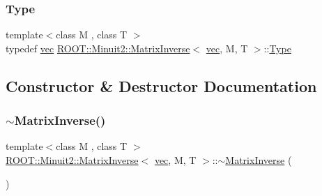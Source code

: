 \mbox{\label{classROOT_1_1Minuit2_1_1MatrixInverse_3_01vec_00_01M_00_01T_01_4_ae925e39424dcc097f76d033365b06efd}} 
\subsubsection{\texorpdfstring{Type}{Type}\hspace{0.1cm}{\footnotesize\ttfamily [3/3]}}
{\footnotesize\ttfamily template$<$class M , class T $>$ \\
typedef \mbox{\hyperlink{classROOT_1_1Minuit2_1_1vec}{vec}} \mbox{\hyperlink{classROOT_1_1Minuit2_1_1MatrixInverse}{R\+O\+O\+T\+::\+Minuit2\+::\+Matrix\+Inverse}}$<$ \mbox{\hyperlink{classROOT_1_1Minuit2_1_1vec}{vec}}, M, T $>$\+::\mbox{\hyperlink{classROOT_1_1Minuit2_1_1MatrixInverse_3_01vec_00_01M_00_01T_01_4_ae925e39424dcc097f76d033365b06efd}{Type}}}



\subsection{Constructor \& Destructor Documentation}
\mbox{\label{classROOT_1_1Minuit2_1_1MatrixInverse_3_01vec_00_01M_00_01T_01_4_ad267e62bc46dd1bab57b3194bd850be9}} 
\subsubsection{\texorpdfstring{$\sim$MatrixInverse()}{~MatrixInverse()}\hspace{0.1cm}{\footnotesize\ttfamily [1/3]}}
{\footnotesize\ttfamily template$<$class M , class T $>$ \\
\mbox{\hyperlink{classROOT_1_1Minuit2_1_1MatrixInverse}{R\+O\+O\+T\+::\+Minuit2\+::\+Matrix\+Inverse}}$<$ \mbox{\hyperlink{classROOT_1_1Minuit2_1_1vec}{vec}}, M, T $>$\+::$\sim$\mbox{\hyperlink{classROOT_1_1Minuit2_1_1MatrixInverse}{Matrix\+Inverse}} (\begin{DoxyParamCaption}{ }\end{DoxyParamCaption})\hspace{0.3cm}{\ttfamily [inline]}}

